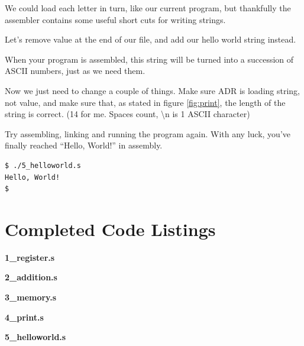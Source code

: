 \documentclass[a4paper, twocolumn, twoside, 11pt]{article}
\begin{document}
		We could load each letter in turn, like our current program, but thankfully the assembler contains some useful short cuts for writing strings.
		
		Let's remove value at the end of our file, and add our hello world string instead.
		
		
		
		When your program is assembled, this string will be turned into a succession of ASCII numbers, just as we need them.
		
		Now we just need to change a couple of things. Make sure ADR is loading string, not value, and make sure that, as stated in figure \ref{fig:print}, the length of the string is correct. (14 for me. Spaces count, \textbackslash n is 1 ASCII character)
		
		Try assembling, linking and running the program again. With any luck, you've finally reached ``Hello, World!'' in assembly.
		
		\begin{lstlisting}
$ ./5_helloworld.s
Hello, World!
$
		\end{lstlisting}

\section{Completed Code Listings}

\textbf{1\_register.s}


\textbf{2\_addition.s}


\textbf{3\_memory.s}


\newpage
\textbf{4\_print.s}


\textbf{5\_helloworld.s}

\end{document}
